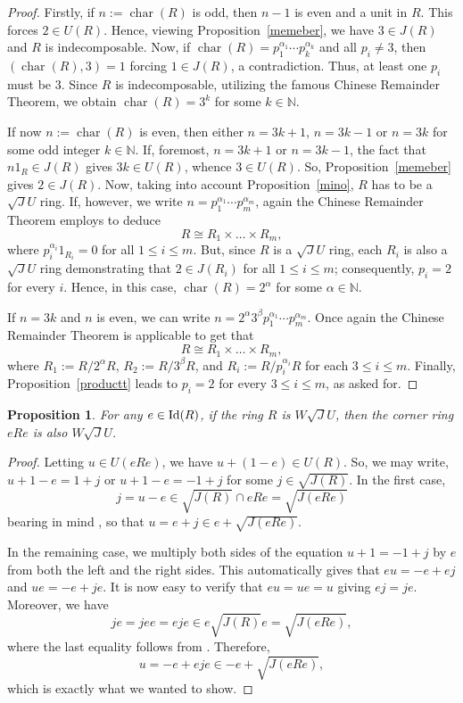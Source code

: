 \documentclass[12pt]{amsart}
\newtheorem{proposition}[theorem]{Proposition} \newtheorem{lemma}[theorem]{Lemma}
\begin{document}
\begin{proof} Firstly, if $n:=\operatorname{char}(R)$ is odd, then $n-1$ is even and a unit in $R$. This forces $2 \in U(R)$. Hence, viewing Proposition~\ref{memeber}, we have $3 \in J(R)$ and $R$ is indecomposable. Now, if
$\operatorname{char}(R)=p_1^{\alpha_1}\cdots p_k^{\alpha_k}$ and all $p_i \neq 3$, then
$(\operatorname{char}(R),3)=1$ forcing $1 \in J(R)$, a contradiction. Thus, at least one $p_i$ must be $3$.
Since $R$ is indecomposable, utilizing the famous Chinese Remainder Theorem, we obtain $\operatorname{char}(R)=3^k$ for some $k \in \mathbb{N}$.

If now $n:=\operatorname{char}(R)$ is even, then either $n=3k+1$, $n=3k-1$ or $n=3k$ for some odd integer $k \in \mathbb{N}$. If, foremost, $n=3k+1$ or $n=3k-1$, the fact that $n1_R \in J(R)$ gives $3k \in U(R)$, whence $3 \in U(R)$. So, Proposition~\ref{memeber} gives $2 \in J(R)$. Now, taking into account Proposition~\ref{mino}, $R$ has to be a $\sqrt{J}U$ ring. If, however, we write $n=p_1^{\alpha_1}\cdots p_m^{\alpha_m}$, again the Chinese Remainder Theorem employs to deduce $$R \cong R_1 \times \dots \times R_m,$$ where $p_i^{\alpha_i}1_{R_i} = 0$ for all $1 \le i \le m$. But, since $R$ is a $\sqrt{J}U$ ring, each
$R_i$ is also a $\sqrt{J}U$ ring demonstrating that $2 \in J(R_i)$ for all $1 \le i \le m$; consequently, $p_i = 2$ for every $i$. Hence, in this case, $\operatorname{char}(R)=2^{\alpha}$ for some $\alpha \in \mathbb{N}$.

If $n=3k$ and $n$ is even, we can write $n=2^{\alpha}3^{\beta}p_1^{\alpha_1}\cdots p_m^{\alpha_m}$. Once again the Chinese Remainder Theorem is applicable to get that \[ R \cong R_1 \times \dots \times R_m, \] where $R_1 := R/2^{\alpha}R$, $R_2 := R/3^{\beta}R$, and $R_i := R/p_i^{\alpha_i}R$ for each $3 \le i \le m$. Finally, Proposition~\ref{productt} leads to $p_i = 2$ for every $3 \le i \le m$, as asked for.
\end{proof}

\begin{proposition}\label{corner} For any \( e \in {\rm Id}(R) \), if the ring \( R \) is $W\sqrt{J}U$, then
the corner ring \( eRe \) is also $W\sqrt{J}U$.
\end{proposition}

\begin{proof} Letting \(u \in U(eRe)\), we have \(u + (1-e) \in U(R)\). So, we may write, $u + 1-e= 1 + j$ or $u + 1-e= -1 + j$ for some $j\in \sqrt{J(R)}$. In the first case, $$j=u-e\in \sqrt{J(R)}\cap eRe=\sqrt{J(eRe)}$$ bearing in mind \cite[Proposition 2.11]{SU}, so that $u=e+j\in e+\sqrt{J(eRe)}$.

In the remaining case, we multiply both sides of the equation \(u + 1 = -1 + j\) by \(e\) from both the left and the right sides. This automatically gives that \(eu = -e + ej\) and \(ue = -e + je\). It is now easy to
verify that \(eu = ue = u\) giving \(ej = je\). Moreover, we have \[ je = jee = eje \in e\sqrt{J(R)}e =
\sqrt{J(eRe)}, \] where the last equality follows from \cite[Proposition 2.11]{SU}. Therefore, \[ u = -e + eje
\in -e + \sqrt{J(eRe)}, \] which is exactly what we wanted to show.
\end{proof}
\end{document}
